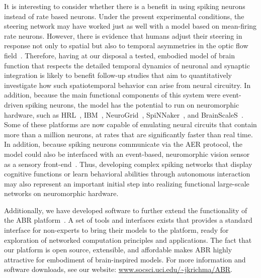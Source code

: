 It is interesting to consider whether there is a benefit in using
spiking neurons instead of rate based neurons. Under the present
experimental conditions, the steering network may have worked
just as well with a model based on mean-firing rate neurons. However,
there is evidence that humans adjust their steering in response
not only to spatial but also to temporal asymmetries in
the optic flow 
field~\citep{Duchon2002,Kountouriotis2013}.
Therefore, having at our disposal a tested, embodied model
of brain function that respects the detailed temporal dynamics of
neuronal and synaptic integration is likely to benefit follow-up
studies that aim to quantitatively investigate how such spatiotemporal
behavior can arise from neural circuitry. In addition, because
the main functional components of this system were event-driven
spiking neurons, the model has the potential to run on neuromorphic
hardware, such as HRL~\citep{Srinivasa2012}, IBM~\citep{Cassidy2014},
NeuroGrid~\citep{Boahen2006}, SpiNNaker~\citep{Khan2008}, and
BrainScaleS~\citep{Schemmel2010}.
Some of these platforms are now capable of emulating neural circuits
that contain more than a million neurons, at rates that are
significantly faster than real time. In addition, because spiking neurons
communicate via the \ac{AER} protocol, the model could also be
interfaced with an event-based, neuromorphic vision sensor as a
sensory front-end~\citep{Lichtsteiner2008}. Thus, developing complex
spiking networks that display cognitive functions or learn
behavioral abilities through autonomous interaction may also
represent an important initial step into realizing functional 
large-scale networks on neuromorphic hardware.

Additionally, we have developed software to further extend the
functionality of the \ac{ABR} platform~\citep{OrosKrichmar2013b}.
A set of tools and interfaces exists that provides a standard interface
for non-experts to bring their models to the platform, ready for
exploration of networked computation principles and applications.
The fact that our platform is open source, extensible, and affordable
makes \ac{ABR} highly attractive for embodiment of brain-inspired
models. For more information and software downloads, see our
website: \url{www.socsci.uci.edu/~jkrichma/ABR}.


